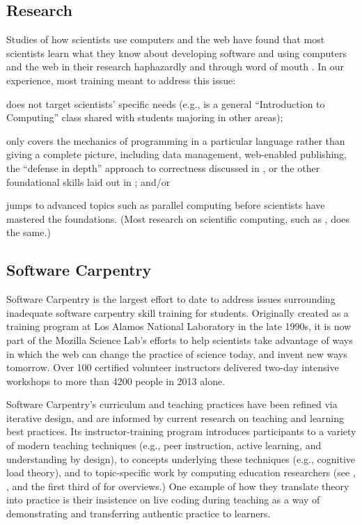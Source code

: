 \documentclass{proposalnsf}
\begin{document}
\subsection{Research}

Studies of how scientists use computers and the web have found that
most scientists learn what they know about developing software and
using computers and the web in their research haphazardly and through word
of mouth \cite{hannay2009,prabhu2011}. In our experience, most
training meant to address this issue:

\begin{compactitem}

\item
  does not target scientists' specific needs (e.g., is a general
  ``Introduction to Computing'' class shared with students majoring in
  other areas);

\item
  only covers the mechanics of programming in a particular language
  rather than giving a complete picture, including data management,
  web-enabled publishing, the ``defense in depth'' approach to
  correctness discussed in \cite{dubois2005}, or the other
  foundational skills laid out in \cite{wilson2013}; and/or

\item
  jumps to advanced topics such as parallel computing before
  scientists have mastered the foundations.  (Most research on
  scientific computing, such as \cite{hochstein2005}, does the same.)

\end{compactitem}

\subsection{Software Carpentry}
\label{sec:SC}

Software Carpentry \cite{swcsite,wilson2012} is the largest effort to
date to address issues surrounding inadequate software carpentry skill
training for students. Originally created as a training program at Los
Alamos National Laboratory in the late 1990s, it is now part of the
Mozilla Science Lab's efforts to help scientists take advantage of
ways in which the web can change the practice of science today, and
invent new ways tomorrow.  Over 100 certified volunteer instructors
delivered two-day intensive workshops to more than 4200 people in 2013
alone.

Software Carpentry's curriculum and teaching practices have been
refined via iterative design, and are informed by current research on
teaching and learning best practices.  Its instructor-training program
\cite{trainingsite} introduces participants to a variety of modern
teaching techniques (e.g., peer instruction, active learning, and
understanding by design), to concepts underlying these techniques
(e.g., cognitive load theory), and to topic-specific work by computing
education researchers (see \cite{guzdial2010}, \cite{hazzan2011}, and
the first third of \cite{sorva2012} for overviews.)  One example of
how they translate theory into practice is their insistence on live
coding during teaching as a way of demonstrating and transferring
authentic practice to learners.
\end{document}
